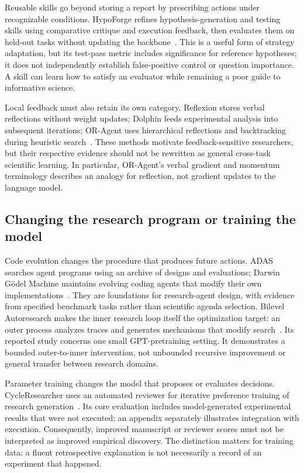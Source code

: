 Reusable skills go beyond storing a report by prescribing actions under recognizable conditions. HypoForge refines hypothesis-generation and testing skills using comparative critique and execution feedback, then evaluates them on held-out tasks without updating the backbone~\cite{hypoforge}. This is a useful form of strategy adaptation, but its test-pass metric includes significance for reference hypotheses; it does not independently establish false-positive control or question importance. A skill can learn how to satisfy an evaluator while remaining a poor guide to informative science.

Local feedback must also retain its own category. Reflexion stores verbal reflections without weight updates; Dolphin feeds experimental analysis into subsequent iterations; OR-Agent uses hierarchical reflections and backtracking during heuristic search~\cite{reflexion,dolphin,or-agent}. These methods motivate feedback-sensitive researchers, but their respective evidence should not be rewritten as general cross-task scientific learning. In particular, OR-Agent's verbal gradient and momentum terminology describes an analogy for reflection, not gradient updates to the language model.

\subsection{Changing the research program or training the model}

Code evolution changes the procedure that produces future actions. ADAS searches agent programs using an archive of designs and evaluations; Darwin G\"odel Machine maintains evolving coding agents that modify their own implementations~\cite{adas,darwin-godel-machine}. They are foundations for research-agent design, with evidence from specified benchmark tasks rather than scientific agenda selection. Bilevel Autoresearch makes the inner research loop itself the optimization target: an outer process analyzes traces and generates mechanisms that modify search~\cite{bilevel-autoresearch}. Its reported study concerns one small GPT-pretraining setting. It demonstrates a bounded outer-to-inner intervention, not unbounded recursive improvement or general transfer between research domains.

Parameter training changes the model that proposes or evaluates decisions. CycleResearcher uses an automated reviewer for iterative preference training of research generation~\cite{cycleresearcher}. Its core evaluation includes model-generated experimental results that were not executed; an appendix separately illustrates integration with execution. Consequently, improved manuscript or reviewer scores must not be interpreted as improved empirical discovery. The distinction matters for training data: a fluent retrospective explanation is not necessarily a record of an experiment that happened.

